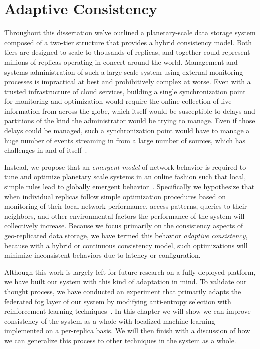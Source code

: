 
\renewcommand{\thechapter}{6}

\chapter{Adaptive Consistency}

Throughout this dissertation we've outlined a planetary-scale data storage system composed of a two-tier structure that provides a hybrid consistency model.
Both tiers are designed to scale to thousands of replicas, and together could represent millions of replicas operating in concert around the world.
Management and systems administration of such a large scale system using external monitoring processes is impractical at best and prohibitively complex at worse.
Even with a trusted infrastructure of cloud services, building a single synchronization point for monitoring and optimization would require the online collection of live information from across the globe, which itself would be susceptible to delays and partitions of the kind the administrator would be trying to manage.
Even if those delays could be managed, such a synchronization point would have to manage a huge number of events streaming in from a large number of sources, which has challenges in and of itself~\cite{spark_streaming}.

Instead, we propose that an \emph{emergent model} of network behavior is required to tune and optimize planetary scale systems in an online fashion such that local, simple rules lead to globally emergent behavior~\cite{bengfort_evolutionary_2014}.
Specifically we hypothesize that when individual replicas follow simple optimization procedures based on monitoring of their local network performance, access patterns, queries to their neighbors, and other environmental factors the performance of the system will collectively increase.
Because we focus primarily on the consistency aspects of geo-replicated data storage, we have termed this behavior \emph{adaptive consistency}, because with a hybrid or continuous consistency model, such optimizations will minimize inconsistent behaviors due to latency or configuration.

Although this work is largely left for future research on a fully deployed platform, we have built our system with this kind of adaptation in mind.
To validate our thought process, we have conducted an experiment that primarily adapts the federated fog layer of our system by modifying anti-entropy selection with reinforcement learning techniques~\cite{bengfort_anti-entropy_2018}.
In this chapter we will show we can improve consistency of the system as a whole with localized machine learning implemented on a per-replica basis.
We will then finish with a discussion of how we can generalize this process to other techniques in the system as a whole.

